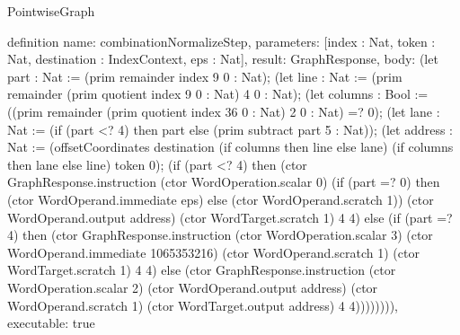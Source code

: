 \begin{lexlean}{PointwiseGraph}
\begin{semanticmodule}
definition{
  name: combinationNormalizeStep,
  parameters: [index : Nat, token : Nat, destination : IndexContext, eps : Nat],
  result: GraphResponse,
  body: (let part : Nat := (prim remainder index 9 0 : Nat); (let line : Nat := (prim remainder (prim quotient index 9 0 : Nat) 4 0 : Nat); (let columns : Bool := ((prim remainder (prim quotient index 36 0 : Nat) 2 0 : Nat) =? 0); (let lane : Nat := (if (part <? 4) then part else (prim subtract part 5 : Nat)); (let address : Nat := (offsetCoordinates destination (if columns then line else lane) (if columns then lane else line) token 0); (if (part <? 4) then (ctor GraphResponse.instruction (ctor WordOperation.scalar 0) (if (part =? 0) then (ctor WordOperand.immediate eps) else (ctor WordOperand.scratch 1)) (ctor WordOperand.output address) (ctor WordTarget.scratch 1) 4 4) else (if (part =? 4) then (ctor GraphResponse.instruction (ctor WordOperation.scalar 3) (ctor WordOperand.immediate 1065353216) (ctor WordOperand.scratch 1) (ctor WordTarget.scratch 1) 4 4) else (ctor GraphResponse.instruction (ctor WordOperation.scalar 2) (ctor WordOperand.output address) (ctor WordOperand.scratch 1) (ctor WordTarget.output address) 4 4)))))))),
  executable: true
}


\end{semanticmodule}
\end{lexlean}
